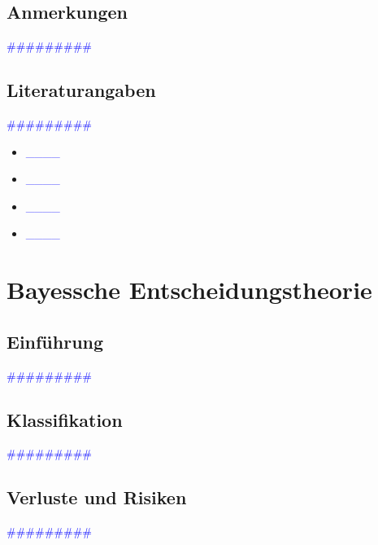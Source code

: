 \documentclass{article}
\begin{document}
  \subsection{Anmerkungen} %
      \textcolor{blue}{\#\#\#\#\#\#\#\#\#}
  \subsection{Literaturangaben} %
      \textcolor{blue}{\#\#\#\#\#\#\#\#\#}

      \begin{itemize}
      \color{red}
        \item  \textcolor{blue}{\_\_\_\_} 
        \item  \textcolor{blue}{\_\_\_\_}
      \color{ForestGreen}
        \item  \textcolor{blue}{\_\_\_\_} 
        \item  \textcolor{blue}{\_\_\_\_}
      \end{itemize}



\newpage
\section{Bayessche Entscheidungstheorie} %
  \subsection{Einführung} %
      \textcolor{blue}{\#\#\#\#\#\#\#\#\#}
  \subsection{Klassifikation} %
      \textcolor{blue}{\#\#\#\#\#\#\#\#\#}
  \subsection{Verluste und Risiken} %
      \textcolor{blue}{\#\#\#\#\#\#\#\#\#}
\end{document}
